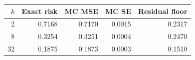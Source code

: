 \begin{tabular}{rrrrr}
\toprule $k$ & Exact risk & MC MSE & MC SE & Residual floor\\\midrule
2 & 0.7168 & 0.7170 & 0.0015 & 0.2317\\
8 & 0.3254 & 0.3251 & 0.0004 & 0.2470\\
32 & 0.1875 & 0.1873 & 0.0003 & 0.1510\\
\bottomrule\end{tabular}